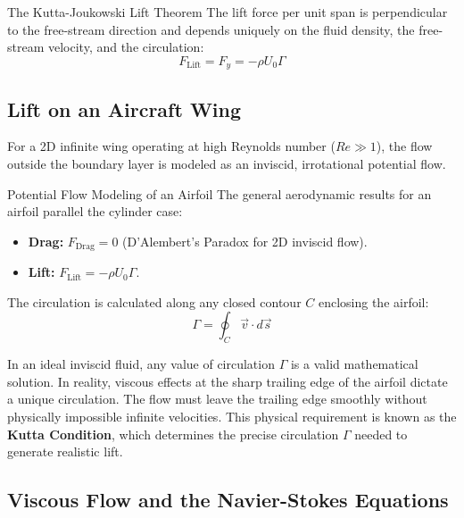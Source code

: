 \begin{resultboxnamed}{The Kutta-Joukowski Lift Theorem}
The lift force per unit span is perpendicular to the free-stream direction and depends uniquely on the fluid density, the free-stream velocity, and the circulation:
\begin{equation}
F_{\text{Lift}} = F_y = -\rho U_0 \Gamma
\end{equation}
\end{resultboxnamed}

\subsection{Lift on an Aircraft Wing}

For a 2D infinite wing operating at high Reynolds number ($Re \gg 1$), the flow outside the boundary layer is modeled as an inviscid, irrotational potential flow. 

\begin{mainbox}{Potential Flow Modeling of an Airfoil}
The general aerodynamic results for an airfoil parallel the cylinder case:
\begin{itemize}
    \item \textbf{Drag:} $F_{\text{Drag}} = 0$ (D'Alembert's Paradox for 2D inviscid flow).
    \item \textbf{Lift:} $F_{\text{Lift}} = -\rho U_0 \Gamma$.
\end{itemize}
The circulation is calculated along any closed contour $C$ enclosing the airfoil:
\begin{equation}
\Gamma = \oint_{C} \vec{v} \cdot d\vec{s}
\end{equation}
\end{mainbox}

\begin{notebox}
In an ideal inviscid fluid, any value of circulation $\Gamma$ is a valid mathematical solution. In reality, viscous effects at the sharp trailing edge of the airfoil dictate a unique circulation. The flow must leave the trailing edge smoothly without physically impossible infinite velocities. This physical requirement is known as the \textbf{Kutta Condition}, which determines the precise circulation $\Gamma$ needed to generate realistic lift.
\end{notebox}

\subsection{Viscous Flow and the Navier-Stokes Equations}

